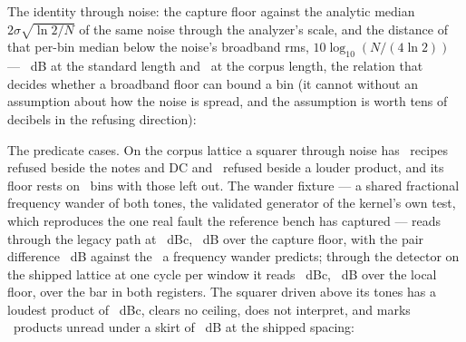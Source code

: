 \documentclass[11pt,a4paper]{article}
\begin{document}
The identity through noise: the capture floor against the analytic median
$2\sigma\sqrt{\ln 2/N}$ of the same noise through the analyzer's scale,
and the distance of that per-bin median below the noise's broadband rms,
$10\log_{10}(N/(4\ln 2))$ --- \iparityPerBinLong\ dB at the standard
length and \iparityPerBinShort\ at the corpus length, the relation that
decides whether a broadband floor can bound a bin (it cannot without an
assumption about how the noise is spread, and the assumption is worth
tens of decibels in the refusing direction):

\begin{center}\scriptsize\setlength{\tabcolsep}{3pt}\iparityNoiseTable\end{center}

The predicate cases. On the corpus lattice a squarer through noise has
\iparityCorpusNearNote\ recipes refused beside the notes and DC and
\iparityCorpusNeighbour\ refused beside a louder product, and its floor
rests on \iparityCorpusFloorBins\ bins with those left out. The wander
fixture --- a shared fractional frequency wander of both tones, the
validated generator of the kernel's own test, which reproduces the one
real fault the reference bench has captured --- reads through the legacy
path at \iparityWanderLegacyWorst\ dBc, \iparityWanderLegacyExcess\ dB
over the capture floor, with the pair difference
\iparityWanderLegacyPairDifference\ dB against the
\iparityWanderExpectedDifference\ a frequency wander predicts; through the
detector on the shipped lattice at one cycle per window it reads
\iparityWanderShippedWorst\ dBc, \iparityWanderShippedExcess\ dB over the
local floor, over the bar in both registers. The squarer driven above its
tones has a loudest product of \iparityLoudLoudest\ dBc, clears no
ceiling, does not interpret, and marks \iparityLoudUnderSkirt\ products
unread under a skirt of \iparityLoudSkirt\ dB at the shipped spacing:

\begin{center}\scriptsize\setlength{\tabcolsep}{4pt}\iparityPredicateTable\end{center}
\end{document}
